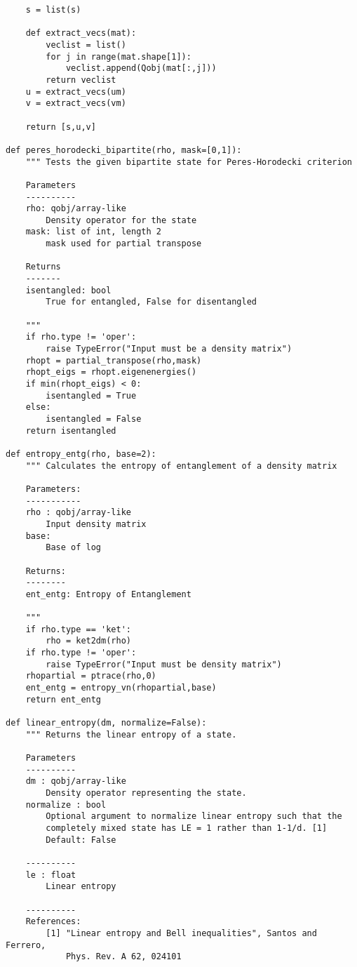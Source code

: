 \begin{verbatim}
    s = list(s)
    
    def extract_vecs(mat):
        veclist = list()
        for j in range(mat.shape[1]):
            veclist.append(Qobj(mat[:,j]))
        return veclist
    u = extract_vecs(um)
    v = extract_vecs(vm)
    
    return [s,u,v]

def peres_horodecki_bipartite(rho, mask=[0,1]):
    """ Tests the given bipartite state for Peres-Horodecki criterion
    
    Parameters
    ----------
    rho: qobj/array-like
        Density operator for the state
    mask: list of int, length 2
        mask used for partial transpose
    
    Returns
    -------
    isentangled: bool
        True for entangled, False for disentangled
    
    """
    if rho.type != 'oper':
        raise TypeError("Input must be a density matrix")
    rhopt = partial_transpose(rho,mask)
    rhopt_eigs = rhopt.eigenenergies()
    if min(rhopt_eigs) < 0:
        isentangled = True
    else:
        isentangled = False
    return isentangled

def entropy_entg(rho, base=2):
    """ Calculates the entropy of entanglement of a density matrix
    
    Parameters:
    -----------
    rho : qobj/array-like
        Input density matrix
    base:
        Base of log
    
    Returns:
    --------
    ent_entg: Entropy of Entanglement
    
    """
    if rho.type == 'ket':
        rho = ket2dm(rho)
    if rho.type != 'oper':
        raise TypeError("Input must be density matrix")
    rhopartial = ptrace(rho,0)
    ent_entg = entropy_vn(rhopartial,base)
    return ent_entg

def linear_entropy(dm, normalize=False):
    """ Returns the linear entropy of a state.
    
    Parameters
    ----------
    dm : qobj/array-like
        Density operator representing the state.
    normalize : bool
        Optional argument to normalize linear entropy such that the
        completely mixed state has LE = 1 rather than 1-1/d. [1]
        Default: False
    
    ----------
    le : float
        Linear entropy
    
    ----------
    References:
        [1] "Linear entropy and Bell inequalities", Santos and Ferrero,
            Phys. Rev. A 62, 024101
    

\end{verbatim}
